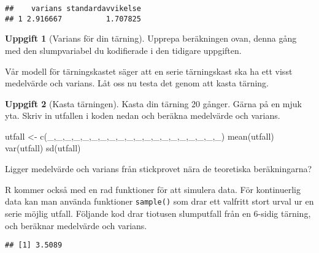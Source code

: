 \documentclass[
]{book}
\newenvironment{Shaded}{\begin{snugshade}}{\end{snugshade}}
\newcommand{\AttributeTok}[1]{\textcolor[rgb]{0.77,0.63,0.00}{#1}}
\newcommand{\DecValTok}[1]{\textcolor[rgb]{0.00,0.00,0.81}{#1}}
\newcommand{\FunctionTok}[1]{\textcolor[rgb]{0.00,0.00,0.00}{#1}}
\newcommand{\NormalTok}[1]{#1}
\newcommand{\OtherTok}[1]{\textcolor[rgb]{0.56,0.35,0.01}{#1}}
\newcommand{\SpecialCharTok}[1]{\textcolor[rgb]{0.00,0.00,0.00}{#1}}
\theoremstyle{definition}
\theoremstyle{definition}
\theoremstyle{definition}
\newtheorem{exercise}{Uppgift}[chapter]
\theoremstyle{definition}
\theoremstyle{remark}
\begin{document}
\begin{verbatim}
##    varians standardavvikelse
## 1 2.916667          1.707825
\end{verbatim}

\begin{exercise}[Varians för din tärning]
Upprepa beräkningen ovan, denna gång med den slumpvariabel du kodifierade i den tidigare uppgiften.
\end{exercise}

Vår modell för tärningskastet säger att en serie tärningskast ska ha ett visst medelvärde och varians. Låt oss nu testa det genom att kasta tärning.

\begin{exercise}[Kasta tärningen]
Kasta din tärning 20 gånger. Gärna på en mjuk yta. Skriv in utfallen i koden nedan och beräkna medelvärde och varians.

\begin{Shaded}
\begin{Highlighting}[]
\NormalTok{utfall }\OtherTok{\textless{}{-}} \FunctionTok{c}\NormalTok{(\_,\_,\_,\_,\_,\_,\_,\_,\_,\_,\_,\_,\_,\_,\_,\_,\_,\_,\_,\_)}
\FunctionTok{mean}\NormalTok{(utfall)}
\FunctionTok{var}\NormalTok{(utfall)}
\FunctionTok{sd}\NormalTok{(utfall)}
\end{Highlighting}
\end{Shaded}

Ligger medelvärde och varians från stickprovet nära de teoretiska beräkningarna?
\end{exercise}

R kommer också med en rad funktioner för att simulera data. För kontinuerlig data kan man använda funktioner \texttt{sample()} som drar ett valfritt stort urval ur en serie möjlig utfall. Följande kod drar tiotusen slumputfall från en 6-sidig tärning, och beräknar medelvärde och varians.

\begin{Shaded}
\end{Shaded}

\begin{verbatim}
## [1] 3.5089
\end{verbatim}
\end{document}
